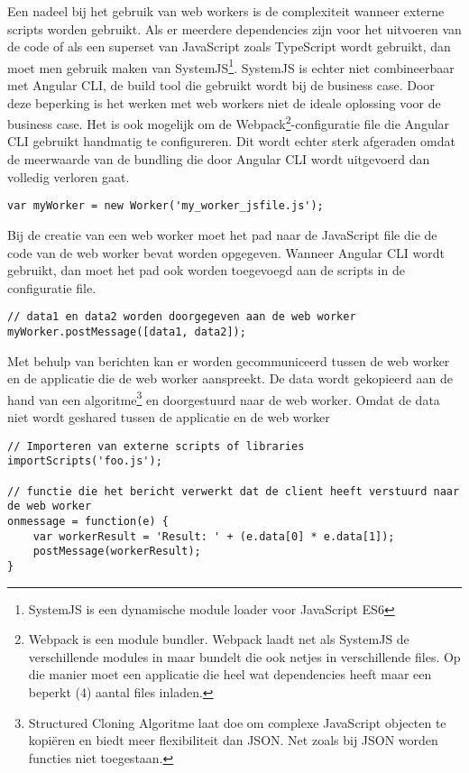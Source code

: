 Een nadeel bij het gebruik van web workers is de complexiteit wanneer externe scripts worden gebruikt. Als er meerdere dependencies zijn voor het uitvoeren van de code of als een superset van JavaScript zoals TypeScript wordt gebruikt, dan moet men gebruik maken van SystemJS\footnote{SystemJS is een dynamische module loader voor JavaScript ES6}. SystemJS is echter niet combineerbaar met Angular CLI, de build tool die gebruikt wordt bij de business case. Door deze beperking is het werken met web workers niet de ideale oplossing voor de business case. Het is ook mogelijk om de Webpack\footnote{Webpack is een module bundler. Webpack laadt net als SystemJS de verschillende modules in maar bundelt die ook netjes in verschillende files. Op die manier moet een applicatie die heel wat dependencies heeft maar een beperkt (4) aantal files inladen.}-configuratie file die Angular CLI gebruikt handmatig te configureren. Dit wordt echter sterk afgeraden omdat de meerwaarde van de bundling die door Angular CLI wordt uitgevoerd dan volledig verloren gaat.

\begin{lstlisting}[caption=Creatie van een web worker]
var myWorker = new Worker('my_worker_jsfile.js');
\end{lstlisting}

Bij de creatie van een web worker moet het pad naar de JavaScript file die de code van de web worker bevat worden opgegeven. Wanneer Angular CLI wordt gebruikt, dan moet het pad ook worden toegevoegd aan de scripts in de configuratie file. 

\begin{lstlisting}[caption=Communicatie tussen applicatie en web worker]
// data1 en data2 worden doorgegeven aan de web worker
myWorker.postMessage([data1, data2]);
\end{lstlisting}

Met behulp van berichten kan er worden gecommuniceerd tussen de web worker en de applicatie die de web worker aanspreekt. De data wordt gekopieerd aan de hand van een algoritme\autocite{structured-cloning-algoritme}\footnote{Structured Cloning Algoritme laat doe om complexe JavaScript objecten te kopi\"eren en biedt meer flexibiliteit dan JSON. Net zoals bij JSON worden functies niet toegestaan. } en doorgestuurd naar de web worker. Omdat de data niet wordt geshared tussen de applicatie en de web worker

\begin{lstlisting}[caption=Voorbeeld hoe een web worker een boodschap verwerkt]
// Importeren van externe scripts of libraries
importScripts('foo.js'); 

// functie die het bericht verwerkt dat de client heeft verstuurd naar de web worker
onmessage = function(e) {
	var workerResult = 'Result: ' + (e.data[0] * e.data[1]);
	postMessage(workerResult);
}
\end{lstlisting}

